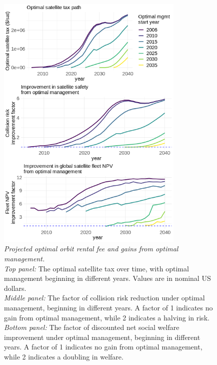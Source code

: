 \documentclass[12pt]{article}
\begin{document}
\begin{figure}[H]
	\centering
	\includegraphics[width=0.8\textwidth]{../../images/7_starts_welfare_and_tax_optstart_2006_remfrac_0_remstart_2030.png}	
	\captionsetup{format=hang}
	\caption[Projected optimal orbit rental fee and gains from optimal management]{\textit{Projected optimal orbit rental fee and gains from optimal management.} \\
		\textit{Top panel:} The optimal satellite tax over time, with optimal management beginning in different years. Values are in nominal US dollars. \\
		\textit{Middle panel:} The factor of collision risk reduction under optimal management, beginning in different years. A factor of 1 indicates no gain from optimal management, while 2 indicates a halving in risk. \\
		\textit{Bottom panel:} The factor of discounted net social welfare improvement under optimal management, beginning in different years. A factor of 1 indicates no gain from optimal management, while 2 indicates a doubling in welfare. \\
	}
	\label{projected_tax_path}
\end{figure}
\end{document}
